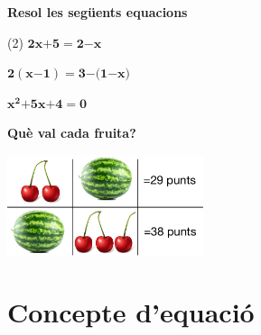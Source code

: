   \vso
  
\begin{iniaval}
	\textbf{Resol les següents equacions}
	
	\begin{tasks}(2)
		\task  $\boldsymbol{2}\boldsymbol{x}\boldsymbol{+}\boldsymbol{5}\boldsymbol{=}\boldsymbol{2}\boldsymbol{-}\boldsymbol{x}$
		
		
		\task
		$ \boldsymbol{2}\left(\boldsymbol{x}\boldsymbol{-}\boldsymbol{1}\right)\boldsymbol{=}\boldsymbol{3}\boldsymbol{-}\boldsymbol{(}\boldsymbol{1}\boldsymbol{-}\boldsymbol{x}\boldsymbol{)}$ 
		
		\vso
		\vso
	 	
		
		\task
		${\boldsymbol{x}}^{\boldsymbol{2}}\boldsymbol{+}\boldsymbol{5}\boldsymbol{x}\boldsymbol{+}\boldsymbol{4}\boldsymbol{=}\boldsymbol{0}$
		
		
		\task \textbf{Què val cada fruita?}
		
		\includegraphics[width=0.43\textwidth]{img-06/tutifruti}
		
		
	\end{tasks}
	\vso
	
	
\end{iniaval}



\pagebreak

\section{ Concepte d'equació }

